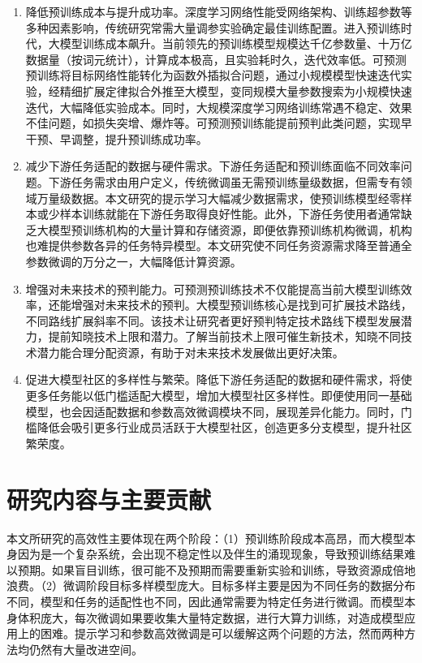 \begin{enumerate}
  \item 降低预训练成本与提升成功率。深度学习网络性能受网络架构、训练超参数等多种因素影响，传统研究常需大量调参实验确定最佳训练配置。进入预训练时代，大模型训练成本飙升。当前领先的预训练模型规模达千亿参数量、十万亿数据量（按词元统计），计算成本极高，且实验耗时久，迭代效率低。可预测预训练将目标网络性能转化为函数外插拟合问题，通过小规模模型快速迭代实验，经精细扩展定律拟合外推至大模型，变同规模大量参数搜索为小规模快速迭代，大幅降低实验成本。同时，大规模深度学习网络训练常遇不稳定、效果不佳问题，如损失突增、爆炸等。可预测预训练能提前预判此类问题，实现早干预、早调整，提升预训练成功率。
  \item 减少下游任务适配的数据与硬件需求。下游任务适配和预训练面临不同效率问题。下游任务需求由用户定义，传统微调虽无需预训练量级数据，但需专有领域万量级数据。本文研究的提示学习大幅减少数据需求，使预训练模型经零样本或少样本训练就能在下游任务取得良好性能。此外，下游任务使用者通常缺乏大模型预训练机构的大量计算和存储资源，即便依靠预训练机构微调，机构也难提供参数各异的任务特异模型。本文研究使不同任务资源需求降至普通全参数微调的万分之一，大幅降低计算资源。
  \item 增强对未来技术的预判能力。可预测预训练技术不仅能提高当前大模型训练效率，还能增强对未来技术的预判。大模型预训练核心是找到可扩展技术路线，不同路线扩展斜率不同。该技术让研究者更好预判特定技术路线下模型发展潜力，提前知晓技术上限和潜力。了解当前技术上限可催生新技术，知晓不同技术潜力能合理分配资源，有助于对未来技术发展做出更好决策。
  \item 促进大模型社区的多样性与繁荣。降低下游任务适配的数据和硬件需求，将使更多任务能以低门槛适配大模型，增加大模型社区多样性。即便使用同一基础模型，也会因适配数据和参数高效微调模块不同，展现差异化能力。同时，门槛降低会吸引更多行业成员活跃于大模型社区，创造更多分支模型，提升社区繁荣度。
\end{enumerate}


\section{研究内容与主要贡献}
本文所研究的高效性主要体现在两个阶段：（1）预训练阶段成本高昂，而大模型本身因为是一个复杂系统，会出现不稳定性以及伴生的涌现现象，导致预训练结果难以预期。如果盲目训练，很可能不及预期而需要重新实验和训练，导致资源成倍地浪费。（2）微调阶段目标多样模型庞大。目标多样主要是因为不同任务的数据分布不同，模型和任务的适配性也不同，因此通常需要为特定任务进行微调。而模型本身体积庞大，每次微调如果要收集大量特定数据，进行大算力训练，对造成模型应用上的困难。提示学习和参数高效微调是可以缓解这两个问题的方法，然而两种方法均仍然有大量改进空间。

